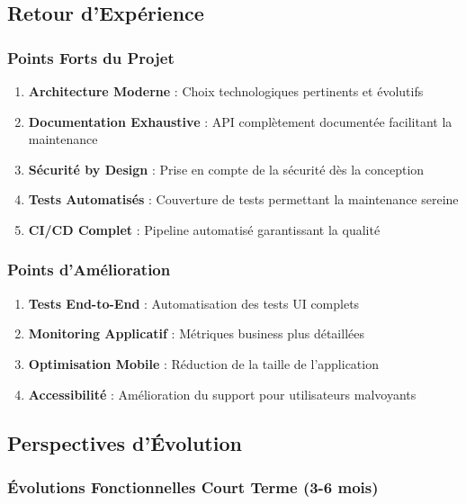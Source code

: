 \subsection{Retour d'Expérience}

\subsubsection{Points Forts du Projet}

\begin{enumerate}
    \item \textbf{Architecture Moderne} : Choix technologiques pertinents et évolutifs
    \item \textbf{Documentation Exhaustive} : API complètement documentée facilitant la maintenance
    \item \textbf{Sécurité by Design} : Prise en compte de la sécurité dès la conception
    \item \textbf{Tests Automatisés} : Couverture de tests permettant la maintenance sereine
    \item \textbf{CI/CD Complet} : Pipeline automatisé garantissant la qualité
\end{enumerate}

\subsubsection{Points d'Amélioration}

\begin{enumerate}
    \item \textbf{Tests End-to-End} : Automatisation des tests UI complets
    \item \textbf{Monitoring Applicatif} : Métriques business plus détaillées
    \item \textbf{Optimisation Mobile} : Réduction de la taille de l'application
    \item \textbf{Accessibilité} : Amélioration du support pour utilisateurs malvoyants
\end{enumerate}

\subsection{Perspectives d'Évolution}

\subsubsection{Évolutions Fonctionnelles Court Terme (3-6 mois)}

